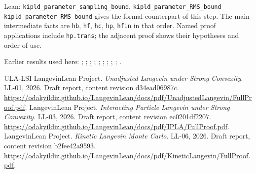 \documentclass[11pt,a4paper]{article}
\begin{document}
\begin{leanbox}{Lean: \texttt{kipld\_\allowbreak{}parameter\_\allowbreak{}sampling\_\allowbreak{}bound}, \texttt{kipld\_\allowbreak{}parameter\_\allowbreak{}RMS\_\allowbreak{}bound}}
\texttt{kipld\_\allowbreak{}parameter\_\allowbreak{}RMS\_\allowbreak{}bound} gives the formal counterpart of this step. The main intermediate facts are \texttt{hb}, \texttt{hf}, \texttt{hc}, \texttt{hp}, \texttt{hfin} in that order. Named proof applications include \texttt{hp.\allowbreak{}trans}; the adjacent proof shows their hypotheses and order of use.
\end{leanbox}


Earlier results used here: \cite[Section~3.17.4]{LangevinLean2026ULASC}; \cite[Section~3.26.15]{LangevinLean2026ULASC}; \cite[Section~3.1.1]{LangevinLean2026IPLA}; \cite[Section~3.1.3]{LangevinLean2026IPLA}; \cite[Section~3.1.6]{LangevinLean2026IPLA}; \cite[Section~3.3.1]{LangevinLean2026IPLA}; \cite[Section~3.3.2]{LangevinLean2026IPLA}; \cite[Section~3.5.1]{LangevinLean2026IPLA}; \cite[Section~3.9.9]{LangevinLean2026IPLA}; \cite[Section~3.115.1]{LangevinLean2026Kinetic}.

\begin{thebibliography}{ULA-LSI}
LangevinLean Project. \emph{Unadjusted Langevin under Strong Convexity}. LL-01, 2026. Draft report, content revision d34ead06987c. \url{https://odakyildiz.github.io/LangevinLean/docs/pdf/UnadjustedLangevin/FullProof.pdf}.
LangevinLean Project. \emph{Interacting Particle Langevin under Strong Convexity}. LL-03, 2026. Draft report, content revision ec0201df2207. \url{https://odakyildiz.github.io/LangevinLean/docs/pdf/IPLA/FullProof.pdf}.
LangevinLean Project. \emph{Kinetic Langevin Monte Carlo}. LL-06, 2026. Draft report, content revision b2fee42a9593. \url{https://odakyildiz.github.io/LangevinLean/docs/pdf/KineticLangevin/FullProof.pdf}.
\end{thebibliography}
\end{document}
